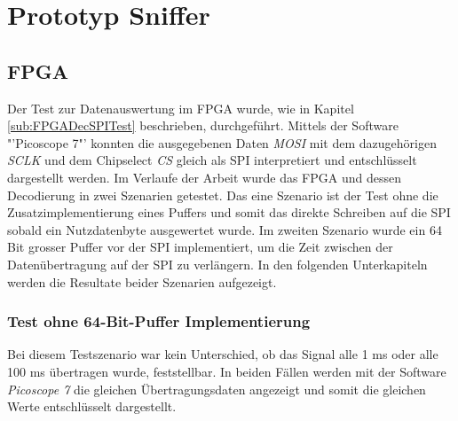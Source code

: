 



\chapter{Prototyp Sniffer} %
\label{Prototyp Sniffer} %


\section{FPGA}
\label{sec:ResultatFPGA}
Der Test zur Datenauswertung im FPGA wurde, wie in Kapitel
\ref{sub:FPGADecSPITest} beschrieben, durchgeführt. Mittels der Software "'Picoscope 7"' konnten die ausgegebenen Daten \textit{MOSI} mit dem dazugehörigen \textit{SCLK} und dem Chipselect \textit{CS} gleich als SPI interpretiert und entschlüsselt dargestellt werden.
Im Verlaufe der Arbeit wurde das FPGA und dessen Decodierung in zwei Szenarien getestet.
Das eine Szenario ist der Test ohne die Zusatzimplementierung eines Puffers und somit das direkte Schreiben auf die SPI sobald ein Nutzdatenbyte ausgewertet wurde.
Im zweiten Szenario wurde ein 64 Bit grosser Puffer vor der SPI implementiert, um die Zeit zwischen der Datenübertragung auf der SPI zu verlängern.
In den folgenden Unterkapiteln werden die Resultate beider Szenarien aufgezeigt.

\subsection{Test ohne 64-Bit-Puffer Implementierung}
\label{sub:ResultatFPGAnoBuff}
Bei diesem Testszenario war kein Unterschied, ob das Signal alle 1 ms oder alle 100 ms übertragen wurde, feststellbar. In beiden Fällen werden mit
der Software \textit{Picoscope 7} die gleichen Übertragungsdaten angezeigt und somit die gleichen Werte entschlüsselt dargestellt.

